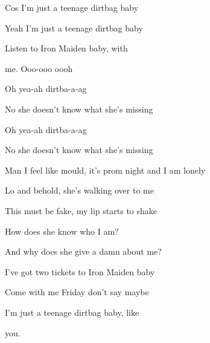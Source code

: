 \begin{song}
\bigskip

Cos I’m just a teenage dirtbag baby  \par
Yeah I’m just a teenage dirtbag baby  \par
{}Listen to Iron Maiden baby, with \par
{}me. Ooo-ooo oooh \par
{}    \par

\bigskip

  Oh yea-ah  dirtba-a-ag \par
No she doesn’t know what she’s missing \par
{}  Oh yea-ah  dirtba-a-ag \par
No she doesn’t know what she’s missing \par

\bigskip

    \par

\bigskip

Man I feel like mould, it’s prom night and I am lonely \par
{}Lo and behold, she’s walking over to me \par
{}This must be fake, my lip starts to shake \par
{}How does she know who I am?  \par
And why does she give a damn about me? \par

\bigskip

I’ve got two tickets to Iron Maiden baby  \par
{}Come with me Friday don’t say maybe  \par
{}I’m just a teenage dirtbag baby, like \par
{}you.   \par
{}    \par


\end{song}
